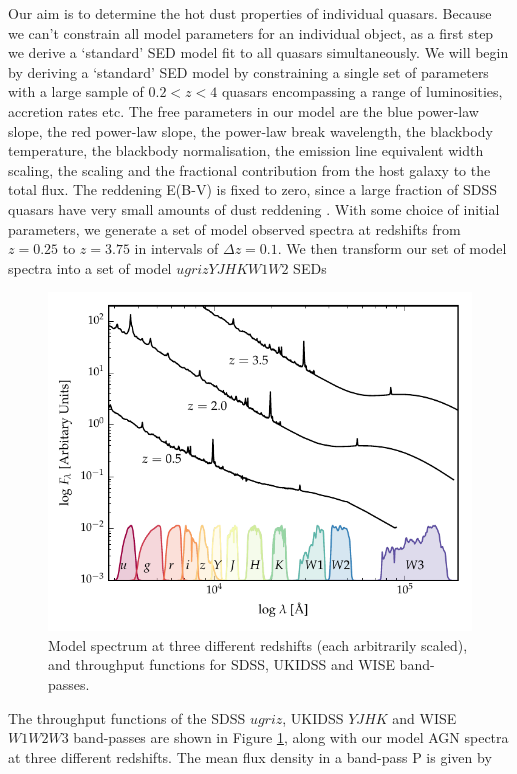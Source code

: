 Our aim is to determine the hot dust properties of individual quasars. 
Because we can't constrain all model parameters for an individual object, as a first step we derive a `standard' \ac{SED} model fit to all quasars simultaneously. 
We will begin by deriving a `standard' SED model by constraining a single set of parameters with a large sample of $0.2 < z < 4$ quasars encompassing a range of luminosities, accretion rates etc. 
The free parameters in our model are the blue power-law slope, the red power-law slope, the power-law break wavelength, the blackbody temperature, the blackbody normalisation, the emission line equivalent width scaling, the \ha scaling and the fractional contribution from the host galaxy to the total flux. 
The reddening E(B-V) is fixed to zero, since a large fraction of SDSS quasars have very small amounts of dust reddening \citep{richards03}. 
With some choice of initial parameters, we generate a set of model observed spectra at redshifts from $z=0.25$ to $z=3.75$ in intervals of $\Delta z = 0.1$. 
We then transform our set of model spectra into a set of model $ugrizYJHKW1W2$ SEDs 

\begin{figure}
  \centering
  \includegraphics[width=\textwidth]{figures/chapter05/throughput.pdf}
  \caption{Model spectrum at three different redshifts (each arbitrarily scaled), and throughput functions for SDSS, UKIDSS and WISE band-passes.}
  \label{fig:filters}
\end{figure}

The throughput functions of the SDSS $ugriz$, UKIDSS $YJHK$ and WISE $W1W2W3$ band-passes are shown in Figure \ref{fig:filters}, along with our model AGN spectra at three different redshifts. 
The mean flux density in a band-pass P is given by 

